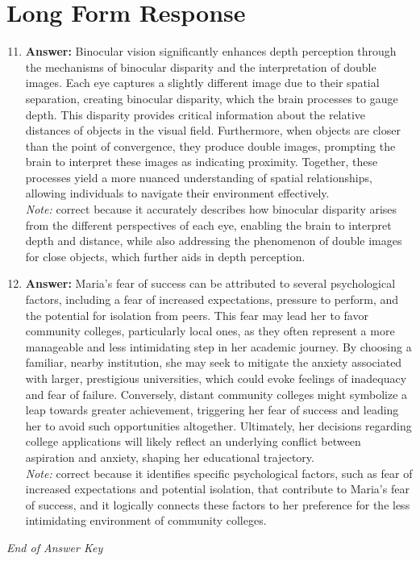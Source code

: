\documentclass[12pt]{article}
\begin{document}
\section*{Long Form Response}
\begin{enumerate}[label=\arabic*.]
\setcounter{enumi}{10}
\item \textbf{Answer:} Binocular vision significantly enhances depth perception through the mechanisms of binocular disparity and the interpretation of double images. Each eye captures a slightly different image due to their spatial separation, creating binocular disparity, which the brain processes to gauge depth. This disparity provides critical information about the relative distances of objects in the visual field. Furthermore, when objects are closer than the point of convergence, they produce double images, prompting the brain to interpret these images as indicating proximity. Together, these processes yield a more nuanced understanding of spatial relationships, allowing individuals to navigate their environment effectively.
\\ \textit{Note:} correct because it accurately describes how binocular disparity arises from the different perspectives of each eye, enabling the brain to interpret depth and distance, while also addressing the phenomenon of double images for close objects, which further aids in depth perception.
\item \textbf{Answer:} Maria's fear of success can be attributed to several psychological factors, including a fear of increased expectations, pressure to perform, and the potential for isolation from peers. This fear may lead her to favor community colleges, particularly local ones, as they often represent a more manageable and less intimidating step in her academic journey. By choosing a familiar, nearby institution, she may seek to mitigate the anxiety associated with larger, prestigious universities, which could evoke feelings of inadequacy and fear of failure. Conversely, distant community colleges might symbolize a leap towards greater achievement, triggering her fear of success and leading her to avoid such opportunities altogether. Ultimately, her decisions regarding college applications will likely reflect an underlying conflict between aspiration and anxiety, shaping her educational trajectory.
\\ \textit{Note:} correct because it identifies specific psychological factors, such as fear of increased expectations and potential isolation, that contribute to Maria's fear of success, and it logically connects these factors to her preference for the less intimidating environment of community colleges.
\end{enumerate}

\vfill
\noindent\textit{End of Answer Key}
\end{document}
